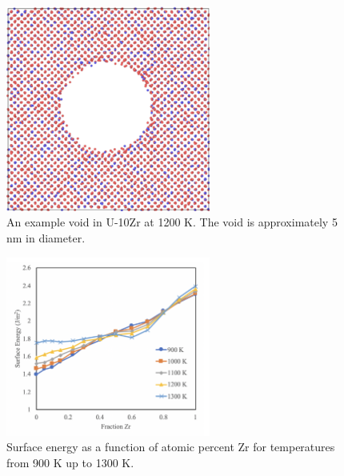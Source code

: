\documentclass[review]{elsarticle}
\begin{document}
\begin{figure}[!htp]
\begin{center}
\includegraphics[width=0.6\textwidth]{7_void}
\end{center}
\caption{An example void in U-10Zr at 1200 K. The void is approximately 5 nm in diameter. }
\label{fig:void}
\end{figure}

\begin{figure}[!htp]
\begin{center}
\includegraphics[width=0.6\textwidth]{8_Esurf}
\end{center}
\caption{Surface energy as a function of atomic percent Zr for temperatures from 900 K up to 1300 K.}
\label{fig:Esurf}
\end{figure}

\FloatBarrier
\end{document}
